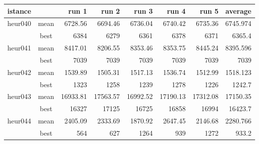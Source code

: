\documentclass[a4paper,12pt]{article}
\begin{document}
\begin{table}[H]
    \centering
    \begin{tabular}{l|c|r|r|r|r|r|r}
        istance  &   & run 1     & run 2  & run 3     & run 4     & run 5      & average \\ %
        \hline
        heur040 & mean & 6728.56 & 6694.46 & 6736.04 & 6740.42 & 6735.36 & 6745.974 \\ %
                & best & 6384    & 6279    & 6361    & 6378    & 6371    & 6365.4   \\ %
        \hline
        heur041 & mean & 8417.01 & 8206.55 & 8353.46 & 8353.75 & 8445.24  & 8395.596 \\ %
                & best & 7039    & 7039    & 7039    & 7039    & 7039     & 7039 \\ %
        \hline
        heur042 & mean & 1539.89 & 1505.31 & 1517.13 & 1536.74 & 1512.99 & 1518.123  \\%
                & best & 1323    & 1258    & 1239    & 1278    &   1226   & 1242.7 \\ %
        \hline
        heur043 & mean & 16933.81& 17563.57& 16992.52& 17190.13& 17312.08 & 17150.35 \\%
                & best & 16327   & 17125   & 16725   & 16858   & 16994   & 16423.7 \\%
        \hline
        heur044 & mean & 2405.09 & 2333.69 & 1870.92 & 2647.45 & 2146.68 & 2280.766 \\%
                & best & 564     & 627     & 1264    & 939     & 1272    & 933.2 \\ %

\end{tabular}
\end{table}
\end{document}
